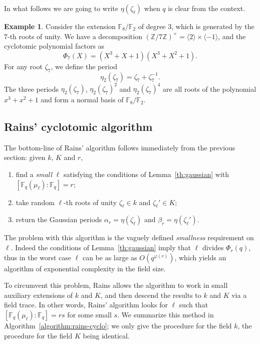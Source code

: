 \documentclass{mcom-l}
\theoremstyle{plain}
\theoremstyle{definition}
\newtheorem{example}[theorem]{Example}
\newcommand{\Z}{\ensuremath{\mathbb{Z}}}
\newcommand{\F}{\ensuremath{\mathbb{F}}}
\newcommand{\euler}{\ensuremath{\varphi}}
\newcounter{algorithm}
\begin{document}
In what follows we are going to write $\eta(\zeta_\ell)$ when $q$ is
clear from the context.

\begin{example} 
  Consider the extension $\F_8/\F_2$ of degree $3$, which is generated
  by the $7$-th roots of unity. We have a decomposition
  $(\Z/7\Z)^\times=\langle 2\rangle\times\langle-1\rangle$, and the
  cyclotomic polynomial factors as
  \begin{equation}
    \Phi_7(X) = (X^3 + X + 1) (X^3 + X^2 + 1).
  \end{equation}
  For any root $\zeta_7$, we define the period
  \begin{equation}
    \eta_2(\zeta_7) = \zeta_7+\zeta_7^{-1}.
  \end{equation}
  The three periods $\eta_2(\zeta_7)$, $\eta_2(\zeta_7)^2$ and
  $\eta_2(\zeta_7)^4$ are all roots of the polynomial $x^3+x^2+1$ and
  form a normal basis of $\F_8/\F_2$.
\end{example}

\subsection{Rains' cyclotomic algorithm}

The bottom-line of Rains' algorithm follows immediately from the
previous section: given $k$, $K$ and $r$,
\begin{enumerate}
\item find a \emph{small} $\ell$ satisfying the conditions of
  Lemma~\ref{th:gaussian} with $[\F_q(\mu_\ell):\F_q]=r$;
\item take random $\ell$-th roots of unity $\zeta_\ell\in k$ and
  $\zeta_\ell'\in K$;
\item return the Gaussian periods $\alpha_r=\eta(\zeta_\ell)$ and
  $\beta_r=\eta(\zeta_\ell')$.
\end{enumerate}

The problem with this algorithm is the vaguely defined
\emph{smallness} requirement on $\ell$. Indeed the conditions of
Lemma~\ref{th:gaussian} imply that $\ell$ divides $\Phi_r(q)$, thus in
the worst case $\ell$ can be as large as $O(q^{\euler(r)})$, which
yields an algorithm of exponential complexity in the field size.

To circumvent this problem, Rains allows the algorithm to work in
small auxiliary extensions of $k$ and $K$, and then descend the
results to $k$ and $K$ via a field trace. In other words, Rains'
algorithm looks for $\ell$ such that $[\F_q(\mu_\ell):\F_q]=rs$ for
some small $s$. We summarize this method in
Algorithm~\ref{algorithm:rains-cyclo}; we only give the procedure for
the field $k$, the procedure for the field $K$ being identical.
\end{document}
